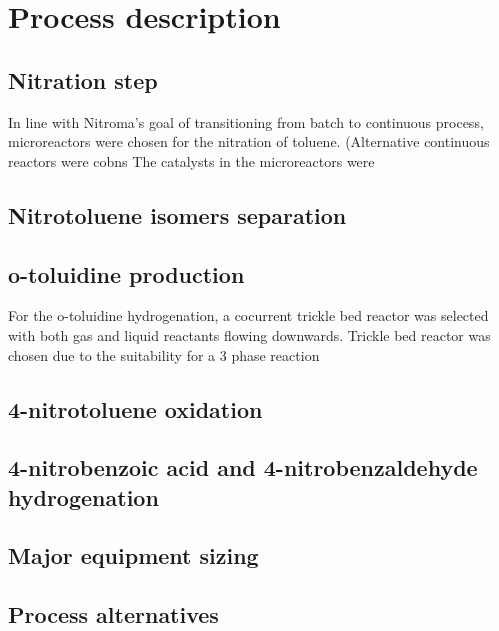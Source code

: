 \section{Process description}
\label{sec:process}
\subsection{Nitration step}
In line with Nitroma's goal of transitioning from batch to continuous process, microreactors were chosen for the nitration of toluene. (Alternative continuous reactors were cobns
The catalysts in the microreactors were 
\subsection{Nitrotoluene isomers separation}



\subsection{o-toluidine production}
For the o-toluidine hydrogenation, a cocurrent trickle bed reactor was selected
with both gas and liquid reactants flowing downwards. Trickle bed reactor was chosen 
due to the suitability for a 3 phase reaction 

\subsection{4-nitrotoluene oxidation}

\subsection{4-nitrobenzoic acid and 4-nitrobenzaldehyde hydrogenation}


\subsection{Major equipment sizing}


\subsection{Process alternatives}



